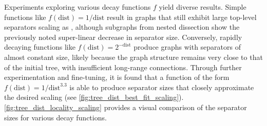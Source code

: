 Experiments exploring various decay functions \(f\) yield diverse results.
Simple functions like \( f(\text{dist}) = 1/\text{dist} \) result in graphs that still exhibit large top-level separators scaling as , although subgraphs from nested dissection show the previously noted super-linear decrease in separator size.
Conversely, rapidly decaying functions like \( f(\text{dist}) = 2^{-\text{dist}} \) produce graphs with separators of almost constant size, likely because the graph structure remains very close to that of the initial tree, with insufficient long-range connections.
Through further experimentation and fine-tuning, it is found that a function of the form \( f(\text{dist}) = 1/\text{dist}^{3.3} \) is able to produce separator sizes that closely approximate the desired  scaling (see \cref{fig:tree_dist_best_fit_scaling}).
\cref{fig:tree_dist_locality_scaling} provides a visual comparison of the separator sizes for various decay functions.

